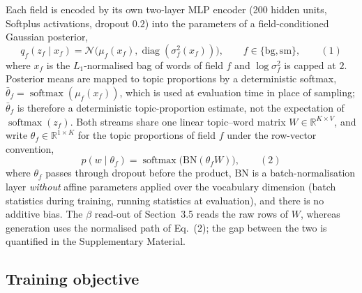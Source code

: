 \documentclass{article}
\begin{document}
Each field is encoded by its own two-layer MLP encoder (200 hidden units, Softplus activations,
dropout $0.2$) into the parameters of a field-conditioned Gaussian posterior,
\begin{equation}
q_f(z_f\mid x_f)=\mathcal N\big(\mu_f(x_f),\operatorname{diag}(\sigma_f^2(x_f))\big),
\qquad f\in\{\mathrm{bg},\mathrm{sm}\},
\qquad(1)\end{equation}
where $x_f$ is the $L_1$-normalised bag of words of field $f$ and $\log\sigma_f^2$ is capped at
$2$. Posterior means are mapped to topic proportions by a deterministic softmax,
$\bar\theta_f=\operatorname{softmax}(\mu_f(x_f))$, which is used at evaluation time in place of
sampling; $\bar\theta_f$ is therefore a deterministic topic-proportion estimate, not the
expectation of $\operatorname{softmax}(z_f)$. Both streams share one linear topic--word matrix
$W\in\mathbb{R}^{K\times V}$, and write $\theta_f\in\mathbb{R}^{1\times K}$ for the topic
proportions of field $f$ under the row-vector convention,
\begin{equation}
p(w\mid\theta_f)=\operatorname{softmax}\!\big(\mathrm{BN}(\theta_f W)\big),
\label{eq:decode}
\qquad(2)\end{equation}
where $\theta_f$ passes through dropout before the product, $\mathrm{BN}$ is a batch-normalisation
layer \emph{without} affine parameters applied over the vocabulary dimension (batch statistics
during training, running statistics at evaluation), and there is no additive bias. The $\beta$
read-out of Section~3.5 reads the raw rows of $W$, whereas generation uses the
normalised path of Eq.~(2); the gap between the two is quantified in the
Supplementary Material.

\subsection{Training objective}
\end{document}
